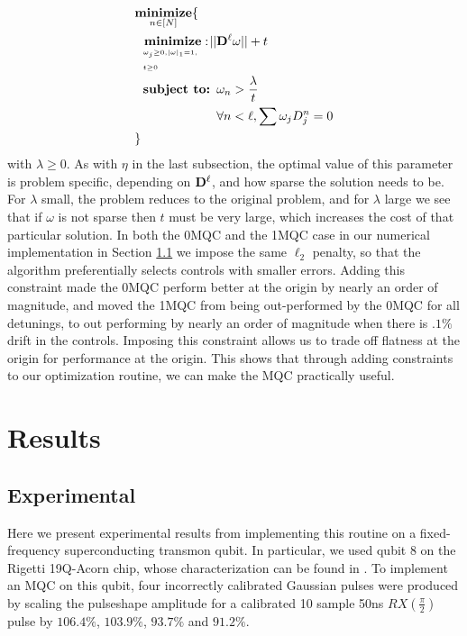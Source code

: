 \documentclass[aps,nofootinbib,pra,notitlepage,twocolumn]{revtex4-1}
\begin{document}
\begin{equation}\label{eq:minimization_regularization}
\begin{split}
&\underset{n\in[N]}{\textbf{minimize}}\{\\
&\ \ \bunderbrace{\textbf{minimize}: }{\omega_j\geq0, |\omega|_1=1,\\ t\geq0} ||{\bold{D}^{\ell}}\omega|| + t\\
&\ \ \textbf{subject to: } \omega_n > \frac{\lambda}{t}\\
&\ \ \phantom{\textbf{subject to: }} \forall n<\ell, \sum \omega_jD_j^n=0\\
&\}
\end{split}
\end{equation} with $\lambda\geq0$. As with $\eta$ in the last subsection, the optimal value of this parameter is problem specific, depending on $\bold{D}^\ell$, and how sparse the solution needs to be. For $\lambda$ small, the problem reduces to the original problem, and for $\lambda$ large we see that if $\omega$ is not sparse then $t$ must be very large, which increases the cost of that particular solution.
In both the 0MQC and the 1MQC case in our numerical implementation in Section \ref{sub:experimental} we impose the same $\ell_2$ penalty, so that the algorithm preferentially selects controls with smaller errors. Adding this constraint made the 0MQC perform better at the origin by nearly an order of magnitude, and moved the 1MQC from being out-performed by the 0MQC for all detunings, to out performing by nearly an order of magnitude when there is $.1\%$ drift in the controls. Imposing this constraint allows us to trade off flatness at the origin for performance at the origin. This shows that through adding constraints to our optimization routine, we can make the MQC practically useful. 
\section{Results} %
\label{sec:results}


\subsection{Experimental} %
\label{sub:experimental}
Here we present experimental results from implementing this routine on a fixed-frequency superconducting transmon qubit. In particular, we used qubit 8 on the Rigetti 19Q-Acorn chip, whose characterization can be found in \cite{1712.05771}. To implement an MQC on this qubit, four incorrectly calibrated Gaussian pulses were produced by scaling the pulseshape amplitude for a calibrated 10 sample 50ns $RX(\frac{\pi}{2})$ pulse by $106.4\%$,  $103.9\%$, $93.7\%$ and $91.2\%$.
\end{document}
